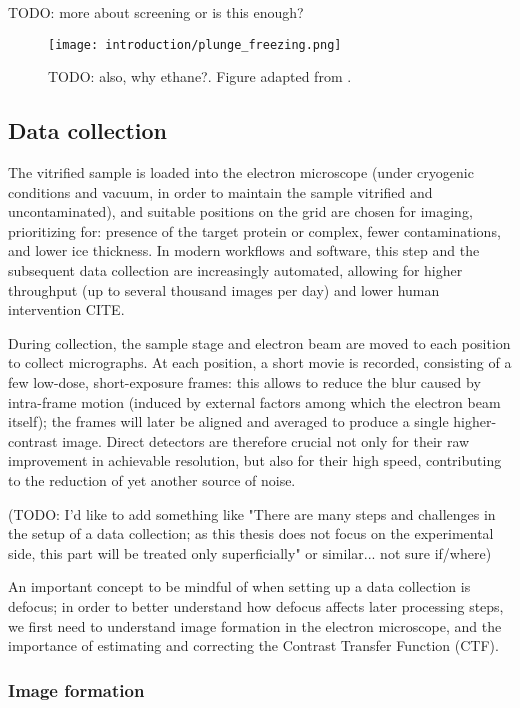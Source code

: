 TODO: more about screening or is this enough?

\begin{figure}[ht]
    \centering
    \texttt{[image: introduction/plunge\_freezing.png]}
    \caption[Vitrification via plunge freezing]{TODO: also, why ethane?. Figure adapted from \citet{chungNobelPrizeChemistry2017}.}
    \label{fig:plunge_freezing}
\end{figure}

\subsection{Data collection}
The vitrified sample is loaded into the electron microscope (under cryogenic conditions and vacuum, in order to maintain the sample vitrified and uncontaminated), and suitable positions on the grid are chosen for imaging, prioritizing for: presence of the target protein or complex, fewer contaminations, and lower ice thickness.
In modern workflows and software, this step and the subsequent data collection are increasingly automated, allowing for higher throughput (up to several thousand images per day) and lower human intervention CITE.

During collection, the sample stage and electron beam are moved to each position to collect micrographs.
At each position, a short movie is recorded, consisting of a few low-dose, short-exposure frames: this allows to reduce the blur caused by intra-frame motion (induced by external factors among which the electron beam itself); the frames will later be aligned and averaged to produce a single higher-contrast image.
Direct detectors are therefore crucial not only for their raw improvement in achievable resolution, but also for their high speed, contributing to the reduction of yet another source of noise.

(TODO: I'd like to add something like "There are many steps and challenges in the setup of a data collection; as this thesis does not focus on the experimental side, this part will be treated only superficially" or similar... not sure if/where)

An important concept to be mindful of when setting up a data collection is defocus; in order to better understand how defocus affects later processing steps, we first need to understand image formation in the electron microscope, and the importance of estimating and correcting the Contrast Transfer Function (CTF).

\subsubsection{Image formation}

